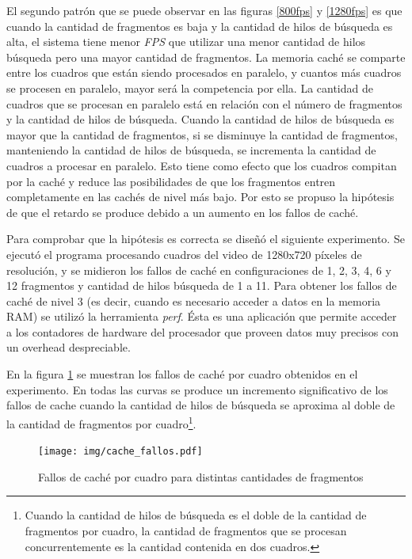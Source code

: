El segundo patrón que se puede observar en las figuras \ref{800fps} y
\ref{1280fps} es que cuando la cantidad de fragmentos es baja y la cantidad de
hilos de búsqueda es alta, el sistema tiene menor \emph{FPS} que utilizar una
menor cantidad de hilos búsqueda pero una mayor cantidad de fragmentos. La
memoria caché se comparte entre los cuadros que están siendo procesados en
paralelo, y cuantos más cuadros se procesen en paralelo, mayor será la competencia
por ella. La cantidad de cuadros que se procesan en paralelo está en relación
con el número de fragmentos y la cantidad de hilos de búsqueda. Cuando la
cantidad de hilos de búsqueda es mayor que la cantidad de fragmentos, si se
disminuye la cantidad de fragmentos, manteniendo la cantidad de hilos de
búsqueda, se incrementa la cantidad de cuadros a procesar en paralelo. Esto
tiene como efecto que los cuadros compitan por la caché y reduce las
posibilidades de que los fragmentos entren completamente en las cachés de nivel
más bajo. Por esto se propuso la hipótesis de que el retardo se produce debido a
un aumento en los fallos de caché.

Para comprobar que la hipótesis es correcta se diseñó el siguiente experimento.
Se ejecutó el programa procesando cuadros del video de 1280x720 píxeles de
resolución, y se midieron los fallos de caché en configuraciones de 1, 2, 3, 4,
6 y 12 fragmentos y cantidad de hilos búsqueda de 1 a 11. Para obtener los
fallos de caché de nivel 3 (es decir, cuando es necesario acceder a datos en la
memoria RAM) se utilizó la herramienta \emph{perf}. Ésta es una aplicación que
permite acceder a los contadores de hardware del procesador que proveen datos
muy precisos con un overhead despreciable.

En la figura \ref{cacheFallos} se muestran los fallos de caché por cuadro
obtenidos en el experimento. En todas las curvas se produce un incremento
significativo de los fallos de cache cuando la cantidad de hilos de búsqueda se
aproxima al doble de la cantidad de fragmentos por cuadro\footnote{Cuando la
cantidad de hilos de búsqueda es el doble de la cantidad de fragmentos por
cuadro, la cantidad de fragmentos que se procesan concurrentemente es la
cantidad contenida en dos cuadros.}.

\begin{figure}[!htb]

	\texttt{[image: img/cache\_fallos.pdf]}
	\caption{Fallos de caché por cuadro para distintas cantidades de
	fragmentos}
	\label{cacheFallos}

\end{figure}

